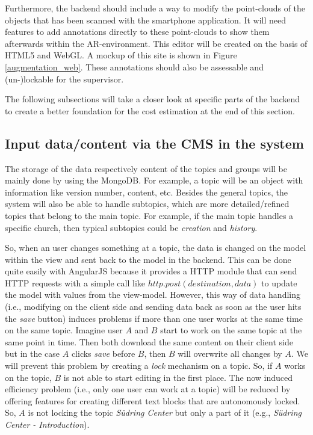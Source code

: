 Furthermore, the backend should include a way to modify the point-clouds of the objects that has been scanned with the smartphone application. It will need features to add annotations directly to these point-clouds to show them afterwards within the \ac{AR}-environment. This editor will be created on the basis of \ac{HTML5} and \ac{WebGL}. A mockup of this site is shown in Figure \ref{augmentation_web}. These annotations should also be assessable and (un-)lockable for the supervisor. 

The following subsections will take a closer look at specific parts of the backend to create a better foundation for the cost estimation at the end of this section. 

\subsection{Input data/content via the \ac{CMS} in the system}
The storage of the data respectively content of the topics and groups will be mainly done by using the MongoDB. For example, a topic will be an object with information like version number, content, etc. Besides the general topics, the system will also be able to handle subtopics, which are more detailed/refined topics that belong to the main topic. For example, if the main topic handles a specific church, then typical subtopics could be \emph{creation} and \emph{history}.

So, when an user changes something at a topic, the data is changed on the model within the view and sent back to the model in the backend. This can be done quite easily with AngularJS because it provides a \ac{HTTP} module that can send \ac{HTTP} requests with a simple call like $http.post(destination,data)$ to update the model with values from the view-model. However, this way of data handling (i.e., modifying on the client side and sending data back as soon as the user hits the \emph{save} button) induces problems if more than one user works at the same time on the same topic. Imagine user $A$ and $B$ start to work on the same topic at the same point in time. Then both download the same content on their client side but in the case $A$ clicks \emph{save} before $B$, then $B$ will overwrite all changes by $A$. We will prevent this problem by creating a \emph{lock} mechanism on a topic. So, if $A$ works on the topic, $B$ is not able to start editing in the first place. The now induced efficiency problem (i.e., only one user can work at a topic) will be reduced by offering features for creating different text blocks that are autonomously locked. So, $A$ is not locking the topic \emph{S\"udring Center} but only a part of it (e.g., \emph{S\"udring Center - Introduction}).

